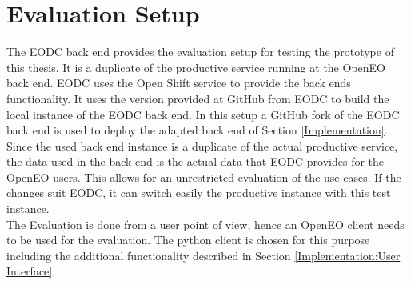\documentclass[draft,final]{vutinfth} %
\begin{document}
 \section{Evaluation Setup}\label{Evaluation:Setup}
The EODC back end provides the evaluation setup for testing the prototype of this thesis. It is a duplicate of the productive service running at the OpenEO back end. EODC uses the Open Shift service to provide the back ends functionality. It uses the version provided at GitHub from EODC to build the local instance of the EODC back end. In this setup a GitHub fork of the EODC back end is used to deploy the adapted back end of Section \ref{Implementation}. Since the used back end instance is a duplicate of the actual productive service, the data used in the back end is the actual data that EODC provides for the OpenEO users. This allows for an unrestricted evaluation of the use cases. If the changes suit EODC, it can switch easily the productive instance with this test instance. \\
The Evaluation is done from a user point of view, hence an OpenEO client needs to be used for the evaluation. The python client is chosen for this purpose including the additional functionality described in Section \ref{Implementation:User Interface}. \\ 

\end{document}
